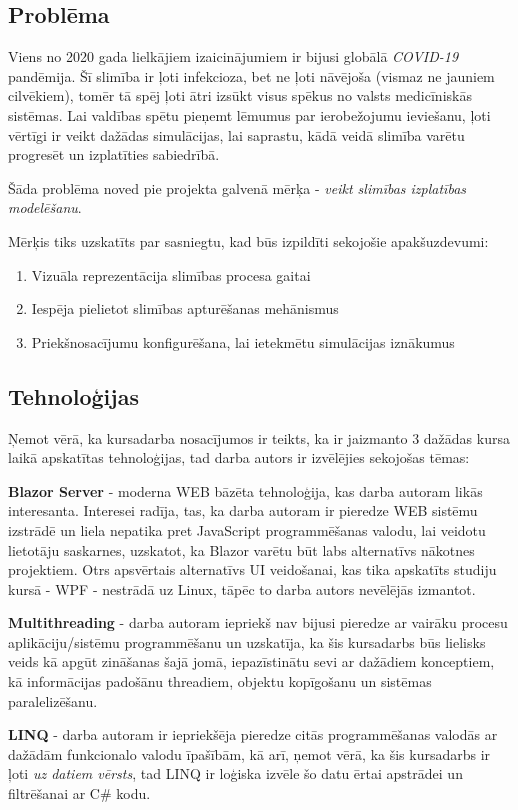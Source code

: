 
\subsection{Problēma}

Viens no 2020 gada lielkājiem izaicinājumiem ir bijusi globālā \emph{COVID-19} pandēmija.
Šī slimība ir ļoti infekcioza, bet ne ļoti nāvējoša (vismaz ne jauniem cilvēkiem), tomēr
tā spēj ļoti ātri izsūkt visus spēkus no valsts medicīniskās sistēmas. Lai valdības spētu
pieņemt lēmumus par ierobežojumu ieviešanu, ļoti vērtīgi ir veikt dažādas simulācijas,
lai saprastu, kādā veidā slimība varētu progresēt un izplatīties sabiedrībā.

Šāda problēma noved pie projekta galvenā mērķa - \emph{veikt slimības izplatības modelēšanu}.

Mērķis tiks uzskatīts par sasniegtu, kad būs izpildīti sekojošie apakšuzdevumi:

\begin{enumerate}
    \item Vizuāla reprezentācija slimības procesa gaitai
    \item Iespēja pielietot slimības apturēšanas mehānismus
    \item Priekšnosacījumu konfigurēšana, lai ietekmētu simulācijas iznākumus
\end{enumerate}

\subsection{Tehnoloģijas}

Ņemot vērā, ka kursadarba nosacījumos ir teikts, ka ir jaizmanto 3 dažādas kursa
laikā apskatītas tehnoloģijas, tad darba autors ir izvēlējies sekojošas tēmas:

\textbf{Blazor Server}\cite{blazor:info} - moderna WEB bāzēta tehnoloģija, kas darba autoram likās interesanta.
Interesei radīja, tas, ka darba autoram ir pieredze WEB sistēmu izstrādē un liela nepatika
pret JavaScript programmēšanas valodu, lai veidotu lietotāju saskarnes, uzskatot,
ka Blazor varētu būt labs alternatīvs nākotnes projektiem. Otrs apsvērtais
alternatīvs UI veidošanai, kas tika apskatīts studiju kursā - WPF - nestrādā uz
Linux, tāpēc to darba autors nevēlējās izmantot.

\textbf{Multithreading} - darba autoram iepriekš nav bijusi pieredze ar vairāku procesu
aplikāciju/sistēmu programmēšanu un uzskatīja, ka šis kursadarbs būs lielisks
veids kā apgūt zināšanas šajā jomā, iepazīstinātu sevi ar dažādiem konceptiem, kā
informācijas padošānu threadiem, objektu kopīgošanu un sistēmas paralelizēšanu.

\textbf{LINQ}\cite{linq:info} - darba autoram ir iepriekšēja pieredze citās programmēšanas
valodās ar dažādām funkcionalo valodu īpašībām, kā arī, ņemot vērā, ka šis
kursadarbs ir ļoti \emph{uz datiem vērsts}, tad LINQ ir loģiska izvēle šo datu
ērtai apstrādei un filtrēšanai ar C\# kodu.
